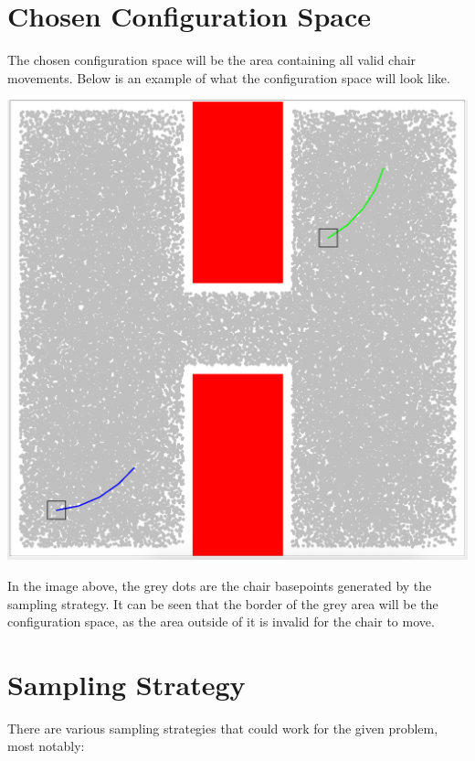 \documentclass[12pt]{article}
\begin{document}
    \maketitle

    \section{Chosen Configuration Space}

    The chosen configuration space will be the area containing all valid chair movements. Below is an example of what the configuration space will look like.

    \centerline{\includegraphics[scale=0.5]{resources/c-space.png}}

    In the image above, the grey dots are the chair basepoints generated by the sampling strategy. It can be seen that the border of the grey area will be the configuration space, as the area outside of it is invalid for the chair to move.

    \section{Sampling Strategy}

    There are various sampling strategies that could work for the given problem, most notably:
\end{document}
